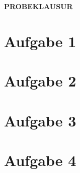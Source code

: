 \newcommand{\examdate}{13.02.2020}
\newcommand{\lecturer}{Andre Wachsmuth}
\newcommand{\modulecode}{3MI-MATHE-10}
\newcommand{\module}{Algebra/Analysis}
\newcommand{\submodule}{Analysis}
\newcommand{\termnumber}{1}
\newcommand{\allottedtime}{40 min}
\newcommand{\permittedtools}{1 handbeschriebenes A4-Blatt}
\newcommand{\scoretable}{
	\begin{tabularx}{\textwidth}{l|Y|Y|Y|Y|Y|Y}
		Aufgabe        & 1 & 2 & 3 & 4  & Zusatz & Summe \\ [1ex] \hline
		Soll-Punktzahl & 7 & 7 & 8 & 8  & 2 &            \\ [3ex]
		Ist-Punktzahl  &   &   &   &    &   &      ¸     \\ [3ex]
	\end{tabularx}
}





\begin{center}
	\textbf{PROBEKLAUSUR}
\end{center}
	


\newpage

\section* {Aufgabe 1}



\newpage

\section* {Aufgabe 2}



\newpage

\section* {Aufgabe 3}



\newpage

\section* {Aufgabe 4}



